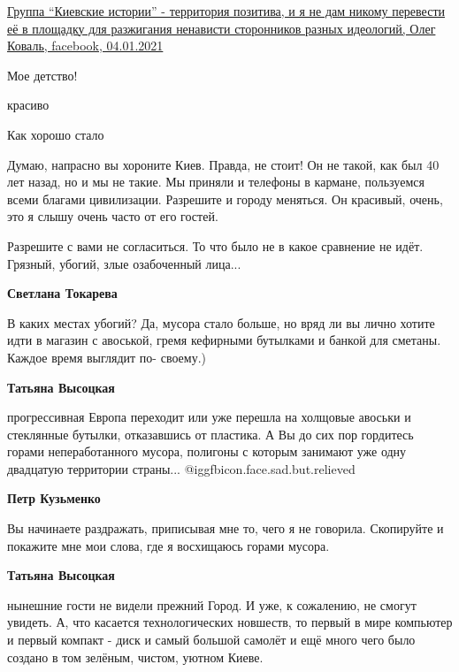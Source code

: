 \begin{itemize}
\begin{itemize}

\href{https://www.facebook.com/groups/story.kiev.ua/posts/1563739173822878}{Группа \enquote{Киевские истории} - территория позитива, и я не дам никому перевести её в площадку для разжигания ненависти сторонников разных идеологий, Олег Коваль, facebook, 04.01.2021}

\end{itemize} %

Мое детство!

красиво

Как хорошо стало


Думаю, напрасно вы хороните Киев. Правда, не стоит! Он не такой, как был 40 лет
назад, но и мы не такие. Мы приняли и телефоны в кармане, пользуемся всеми благами
цивилизации. Разрешите и городу меняться. Он красивый, очень, это я слышу очень
часто от его гостей.

\begin{itemize} %

Разрешите с вами не согласиться. То что было не в какое сравнение не идёт.
Грязный, убогий, злые озабоченный лица...

\begin{itemize} %
\textbf{Светлана Токарева} 

В каких местах убогий? Да, мусора стало больше, но вряд ли вы лично хотите идти
в магазин с авоськой, гремя кефирными бутылками и банкой для сметаны. Каждое
время выглядит по- своему.)

\textbf{Татьяна Высоцкая} 

прогрессивная Европа переходит или уже перешла на холщовые авоськи и стеклянные
бутылки, отказавшись от пластика. А Вы до сих пор гордитесь горами
непеработанного мусора, полигоны с которым занимают уже одну двадцатую
территории страны... @igg{fbicon.face.sad.but.relieved} 

\textbf{Петр Кузьменко} 

Вы начинаете раздражать, приписывая мне то, чего я не говорила. Скопируйте и
покажите мне мои слова, где я восхищаюсь горами мусора.

\end{itemize} %

\textbf{Татьяна Высоцкая} 

нынешние гости не видели прежний Город. И уже, к сожалению, не смогут увидеть.
А, что касается технологических новшеств, то первый в мире компьютер и первый
компакт - диск и самый большой самолёт и ещё много чего было создано в том
зелёным, чистом, уютном Киеве.


\end{itemize}
\end{itemize}
